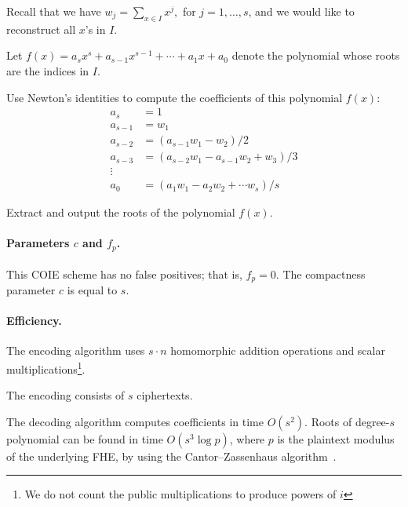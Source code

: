 \begin{algorithm}[htbp!]
\BEN
\item Recall that we have $w_j = \sum_{x \in I} x^j,$ for $j = 1,
\ldots, s$, and we would like to reconstruct all $x$'s in $I$.

\item Let $f(x) = a_s x^s + a_{s-1} x^{s-1} + \cdots + a_1 x + a_0$
denote the polynomial whose roots are the indices in $I$. 

\item Use Newton's identities to compute the coefficients of this
polynomial $f(x)$:  
\begin{align*}
a_s &= 1\\
a_{s-1} &= w_1\\
a_{s-2} &= (a_{s-1} w_1 - w_2 )/2\\
a_{s-3} &= (a_{s-2} w_1 - a_{s-1} w_2 + w_3)/3\\
\vdots\\
a_{0} &= (a_{1} w_1 - a_{2} w_2 + \cdots w_s)/s
\end{align*}
\item Extract and output the roots of the polynomial $f(x)$. 
\EEN
\caption{ ${\sf PS\mbox{-}COIE}.\Decode(\lbra w_1 \lket, \ldots, \lbra w_s \lket)$} \label{alg:pscoie}
\end{algorithm}

\paragraph{Parameters $c$ and $f_p$.} This COIE scheme has no false
positives; that is, $f_p = 0$. The compactness parameter $c$ is
equal to $s$. 


\paragraph{Efficiency.}
\BI
\item The encoding algorithm uses $s \cdot n$ homomorphic addition
operations and scalar multiplications\footnote{We do not count the public multiplications to produce powers of $i$}.

\item The encoding consists of $s$ ciphertexts.

\item The decoding algorithm computes coefficients in time $O(s^2)$.
Roots of degree-$s$ polynomial can be found in time $O(s^3 \log p)$,
where $p$ is the plaintext modulus of the underlying FHE, by using the
Cantor–Zassenhaus algorithm~\cite{CanZas81}. 
\EI


